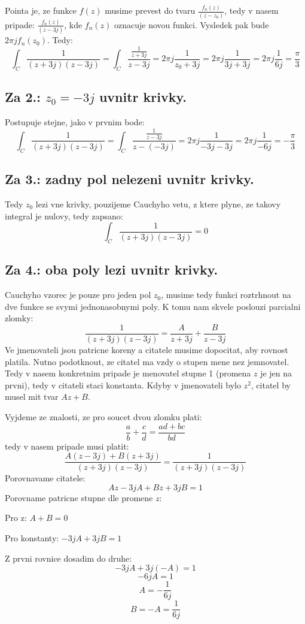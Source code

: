 Pointa je, ze funkce $f(z)$ musime prevest do tvaru $\frac{f_n(z)}{(z-z_0)}$, tedy v nasem pripade: $\frac{f_n(z)}{(z-3j)}$, kde $f_n(z)$ oznacuje novou funkci. Vysledek pak bude $2\pi j f_n(z_0)$.
Tedy:
$$\int_C \frac{1}{(z+3j)(z-3j)} = \int_C \frac{\frac{1}{z+3j}}{z-3j} = 2 \pi j \frac{1}{z_0 +3j} = 2 \pi j \frac{1}{3j+3j} = 2 \pi j \frac{1}{6j} = \frac{\pi}{3}$$

\subsection*{Za 2.: $z_0 = -3j$ uvnitr krivky.}
Postupuje stejne, jako v prvnim bode:
$$\int_C \frac{1}{(z+3j)(z-3j)} = \int_C \frac{\frac{1}{z-3j}}{z-(-3j)} = 2\pi j \frac{1}{-3j -3j} = 2\pi j \frac{1}{-6j} = -\frac{\pi}{3}$$

\subsection*{Za 3.: zadny pol nelezeni uvnitr krivky.}
Tedy $z_0$ lezi vne krivky, pouzijeme Cauchyho vetu, z ktere plyne, ze takovy integral je nulovy, tedy zapsano:
$$\int_C \frac{1}{(z+3j)(z-3j)} = 0 $$

\subsection*{Za 4.: oba poly lezi uvnitr krivky.}
Cauchyho vzorec je pouze pro jeden pol $z_0$, musime tedy funkci roztrhnout na dve funkce se svymi jednonasobnymi poly. K tomu nam skvele poslouzi parcialni zlomky:
$$\frac{1}{(z+3j)(z-3j)} = \frac{A}{z+3j} + \frac{B}{z-3j}$$
Ve jmenovateli jsou patricne koreny a citatele musime dopocitat, aby rovnost platila. Nutno podotknout, ze citatel ma vzdy o stupen mene nez jemnovatel. Tedy v nasem konkretnim pripade je menovatel stupne 1 (promena $z$ je jen na prvni), tedy v citateli staci konstanta. Kdyby v jmenovateli bylo $z^2$, citatel by musel mit tvar $Az+B$.

Vyjdeme ze znalosti, ze pro soucet dvou zlomku plati:
$$\frac{a}{b}+\frac{c}{d} = \frac{ad+bc}{bd}$$
tedy v nasem pripade musi platit:
$$\frac{A(z-3j)+B(z+3j)}{(z+3j)(z-3j)} = \frac{1}{(z+3j)(z-3j)}$$
Porovnavame citatele:
$$Az -3jA + Bz + 3jB = 1$$
Porovname patricne stupne dle promene $z$:

Pro z: $A+B = 0$

Pro konstanty: $-3jA + 3jB = 1$

Z prvni rovnice dosadim do druhe:
$$-3jA + 3j(-A) = 1$$
$$-6jA = 1$$
$$A = -\frac{1}{6j}$$
$$B = -A = \frac{1}{6j}$$

